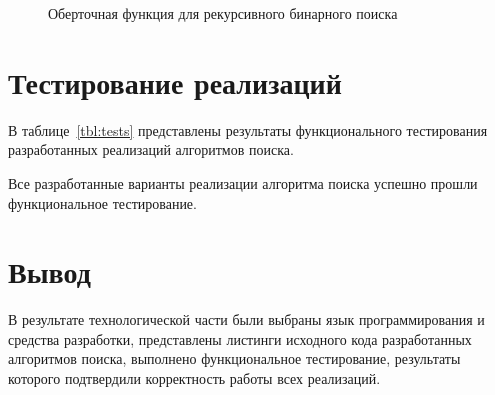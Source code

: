 \begin{figure}[H]
	\centering
		
		\caption{Оберточная функция для рекурсивного бинарного поиска}
		\label{fig:wrapper}
\end{figure}

\section{Тестирование реализаций}
В таблице~\ref{tbl:tests} представлены результаты функционального тестирования разработанных реализаций алгоритмов поиска.



Все разработанные варианты реализации алгоритма поиска успешно прошли функциональное тестирование.

\section{Вывод}
В результате технологической части были выбраны язык программирования и средства разработки, представлены листинги исходного кода разработанных алгоритмов поиска, выполнено функциональное тестирование, результаты которого подтвердили корректность работы всех реализаций.